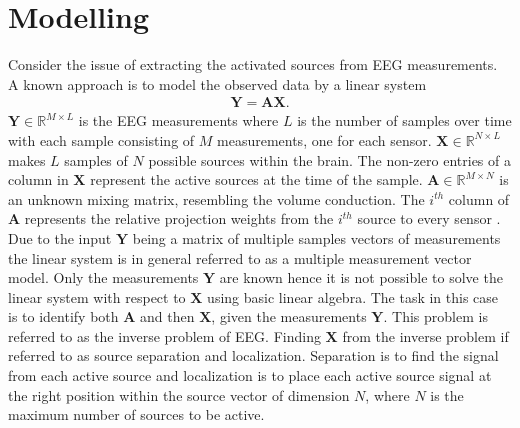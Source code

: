 %     


\section{Modelling}
Consider the issue of extracting the activated sources from EEG measurements. A known approach is to model the observed data by a linear system 
\begin{align*}
\mathbf{Y} = \mathbf{AX}.
\end{align*}
$\mathbf{Y} \in \mathbb{R}^{M \times L}$ is the EEG measurements where $L$ is the number of samples over time with each sample consisting of $M$ measurements, one for each sensor. $\mathbf{X} \in \mathbb{R}^{N \times L}$ makes $L$ samples of $N$ possible sources within the brain. The non-zero entries of a column in $\textbf{X}$ represent the active sources at the time of the sample. $\mathbf{A} \in \mathbb{R}^{M \times N}$ is an unknown mixing matrix, resembling the volume conduction. 
The $i^{th}$ column of $\mathbf{A}$ represents the relative projection weights from the $i^{th}$ source to every sensor \cite{phd2015}. 
Due to the input $\textbf{Y}$ being a matrix of multiple samples vectors of measurements the linear system is in general referred to as a multiple measurement vector model. 
Only the measurements $\textbf{Y}$ are known hence it is not possible to solve the linear system with respect to $\textbf{X}$ using basic linear algebra.   
The task in this case is to identify both $\mathbf{A}$ and then $\mathbf{X}$, given the measurements $\mathbf{Y}$. This problem is referred to as the inverse problem of EEG. 
Finding $\textbf{X}$ from the inverse problem if referred to as source separation and localization. Separation is to find the signal from each active source and localization is to place each active source signal at the right position within the source vector of dimension $N$, where $N$ is the maximum number of sources to be active.      

